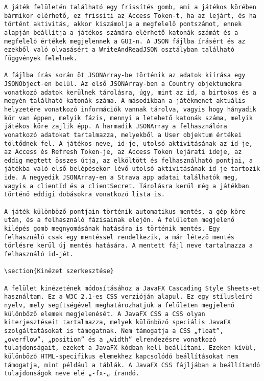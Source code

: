 \begin{verbatim}
A játék felületén található egy frissítés gomb, ami a játékos körében bármikor elérhető, ez frissíti az Access Token-t, ha az lejárt, és ha történt aktivitás, akkor kiszámolja a megfelelő pontszámot, ennek alapján beállítja a játékos számára elérhető katonák számát és a megfelelő értékek megjelennek a GUI-n. A JSON fájlba írásért és az ezekből való olvasásért a WriteAndReadJSON osztályban található függvények felelnek. 

A fájlba írás során öt JSONArray-be történik az adatok kiírása egy JSONObject-en belül. Az első JSONArray-ben a Country objektumokra vonatkozó adatok kerülnek tárolásra, úgy, mint az id, a birtokos és a megyén található katonák száma. A másodikban a játékmenet aktuális helyzetére vonatkozó információk vannak tárolva, vagyis hogy hányadik kör van éppen, melyik fázis, mennyi a letehető katonák száma, melyik játékos köre zajlik épp. A harmadik JSONArray a felhasználóra vonatkozó adatokat tartalmazza, melyekből a User objektum értékei töltődnek fel. A játékos neve, id-je, utolsó aktivitásának az id-je, az Access és Refresh Token-je, az Access Token lejárati ideje, az eddig megtett összes útja, az elköltött és felhasználható pontjai, a játékba való első belépésekor lévő utolsó aktivitásának id-je tartozik ide. A negyedik JSONArray-en a Strava app adatai találhatók meg, vagyis a clientId és a clientSecret. Tárolásra kerül még a játékban történő eddigi dobásokra vonatkozó lista is. 

A játék különböző pontjain történik automatikus mentés, a gép köre után, és a felhasználó fázisainak elején. A felületen megjelenő kilépés gomb megnyomásának hatására is történik mentés. Egy felhasználó csak egy mentéssel rendelkezik, a már létező mentés törlésre kerül új mentés hatására. A mentett fájl neve tartalmazza a felhasználó id-jét. 

\section{Kinézet szerkesztése}

A felület kinézetének módosításához a JavaFX Cascading Style Sheets-et használtam. Ez a W3C 2.1-es CSS verzióján alapul. Ez egy stílusleíró nyelv, mely segítségével meghatározhatjuk a felületen megjelenő különböző elemek megjelenését. A JavaFX CSS a CSS olyan kiterjesztéseit tartalmazza, melyek különböző speciális JavaFX szolgáltatásokat is támogatnak. Nem támogatja a CSS „float”, „overflow”, „position” és a „width” elrendezésre vonatkozó tulajdonságait, ezeket a JavaFX kódban kell beállítani. Ezeken kívül, különböző HTML-specifikus elemekhez kapcsolódó beállításokat nem támogatja, mint például a táblák. A JavaFX CSS fájljában a beállítandó tulajdonságok neve elé „-fx-„ írandó. 


\end{verbatim}
